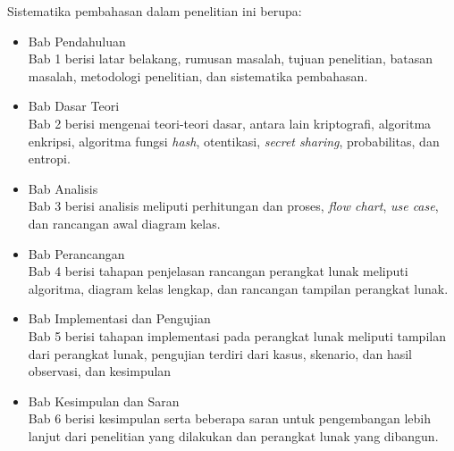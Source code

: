 Sistematika pembahasan dalam penelitian ini berupa:
\begin{itemize}
	\item Bab Pendahuluan
	\\Bab 1 berisi latar belakang, rumusan masalah, tujuan penelitian, batasan masalah, metodologi penelitian, dan sistematika pembahasan.
	\item Bab Dasar Teori
	\\Bab 2 berisi mengenai teori-teori dasar, antara lain kriptografi, algoritma enkripsi, algoritma fungsi \textit{hash}, otentikasi, \textit{secret sharing}, probabilitas, dan entropi.
	\item Bab Analisis
	\\Bab 3 berisi analisis meliputi perhitungan dan proses, \textit{flow chart}, \textit{use case}, dan rancangan awal diagram kelas.
	\item Bab Perancangan
	\\Bab 4 berisi tahapan penjelasan rancangan perangkat lunak meliputi algoritma, diagram kelas lengkap, dan rancangan tampilan perangkat lunak.
	\item Bab Implementasi dan Pengujian
	\\Bab 5 berisi tahapan implementasi pada perangkat lunak meliputi tampilan dari perangkat lunak, pengujian terdiri dari kasus, skenario, dan hasil observasi, dan kesimpulan
	\item Bab Kesimpulan dan Saran
	\\Bab 6 berisi kesimpulan serta beberapa saran untuk pengembangan lebih lanjut dari penelitian yang dilakukan dan perangkat lunak yang dibangun.
\end{itemize}